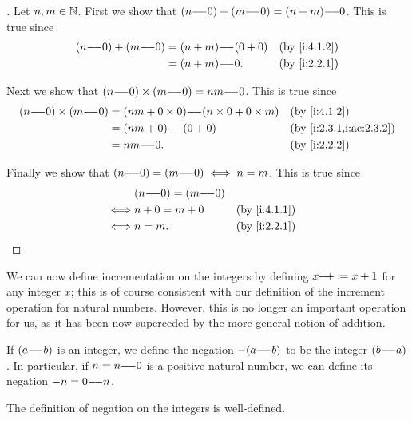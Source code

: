 \begin{proof}[]
  Let \(n, m \in \mathbb{N}\).
  First we show that \((n {-}\!{-} 0) + (m {-}\!{-} 0) = (n + m) {-}\!{-} 0\).
  This is true since
  \begin{align*}
    (n \mm 0) + (m \mm 0) & = (n + m) \mm (0 + 0) &  & \by{i:4.1.2} \\
                          & = (n + m) \mm 0.      &  & \by{i:2.2.1}
  \end{align*}

  Next we show that \((n {-}\!{-} 0) \times (m {-}\!{-} 0) = nm {-}\!{-} 0\).
  This is true since
  \begin{align*}
    (n \mm 0) \times (m \mm 0) & = (nm + 0 \times 0) \mm (n \times 0 + 0 \times m) &  & \by{i:4.1.2}            \\
                               & = (nm + 0) \mm (0 + 0)                            &  & \by{i:2.3.1,i:ac:2.3.2} \\
                               & = nm \mm 0.                                       &  & \by{i:2.2.2}
  \end{align*}

  Finally we show that \((n {-}\!{-} 0) = (m {-}\!{-} 0) \iff n = m\).
  This is true since
  \begin{align*}
         & (n \mm 0) = (m \mm 0)                   \\
    \iff & n + 0 = m + 0         &  & \by{i:4.1.1} \\
    \iff & n = m.                &  & \by{i:2.2.1}
  \end{align*}
\end{proof}

\begin{note}
  We can now define incrementation on the integers by defining \(x{+}\!{+} \coloneqq x + 1\) for any integer \(x\);
  this is of course consistent with our definition of the increment operation for natural numbers.
  However, this is no longer an important operation for us, as it has been now superceded by the more general notion of addition.
\end{note}

\begin{defn}\label{i:4.1.4}
  If \((a {-}\!{-} b)\) is an integer, we define the negation \(-(a {-}\!{-} b)\) to be the integer \((b {-}\!{-} a)\).
  In particular, if \(n = n {-}\!{-} 0\) is a positive natural number, we can define its negation \(-n = 0 {-}\!{-} n\).
\end{defn}

\begin{ac}\label{i:ac:4.1.3}
  The definition of negation on the integers is well-defined.
\end{ac}

